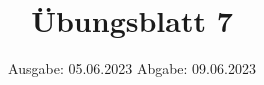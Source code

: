 

\title{Übungsblatt 7}
\date{%
  Ausgabe: 05.06.2023 %
  \hspace{3em}
  Abgabe: 09.06.2023 %
}



\maketitle
\thispagestyle{empty}
\tableofcontents
\newpage



%

